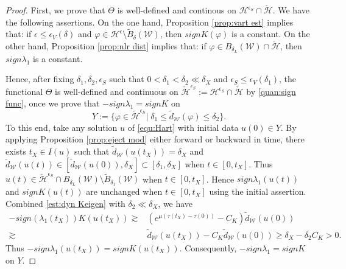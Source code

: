 \documentclass[reqno, 11pt]{amsart}
\numberwithin{equation}{section}
\theoremstyle{plain}
\theoremstyle{definition}
\numberwithin{equation}{section}
\numberwithin{theorem}{section}
\numberwithin{equation}{section}
\numberwithin{equation}{section}
\numberwithin{theorem}{section}
\begin{document}
	\begin{proof}
		First, we prove that $\Theta$ is well-defined and continous on $\mathcal{H}^{\epsilon_S} \cap \check{\mathcal{H}}$. We have the following assertions. On the one hand, Proposition \ref{prop:vart est} implies that: if $\epsilon\leq \epsilon_{V}(\delta)$ and $\varphi\in \mathcal{H}^{\epsilon}\setminus \widetilde{B}_{\delta}(\mathcal{W})$, then $signK(\varphi)$ is a constant. On the other hand, Proposition \ref{prop:nlr dist} implies that: if $\varphi\in B_{\delta_L}(\mathcal{W})\cap \check{\mathcal{H}}$, then $sign \lambda_{1}$ is a constant.
		
		Hence, after fixing $\delta_1,\delta_2,\epsilon_{S}$ such that $0<\delta_1<\delta_2\ll \delta_{X}$ and $\epsilon_S\leq \epsilon_{V}(\delta_1)$, the functional $\Theta$ is well-defined  and continuous on $\check{\mathcal{H}}^{\epsilon_S}:=\mathcal{H}^{\epsilon_S}\cap \check{\mathcal{H}}$ by \eqref{quan:sign func}, once we prove that $-sign \lambda_{1}=signK$ on 
		\begin{equation*}
		Y:=\{ \varphi\in \check{\mathcal{H}}^{\epsilon_S}|\;\delta_1\leq \widetilde{d}_{\mathcal{W}}(\varphi)\leq \delta_2 \}.
		\end{equation*}
		To this end, take any solution $u$ of \eqref{equ:Hart} with initial data $u(0)\in Y$. By applying Proposition \ref{prop:eject mod} either forward or backward in time, there exists $t_X\in I(u)$ such that $\widetilde{d}_{\mathcal{W}}(u(t_X))=\delta_X$ and $\widetilde{d}_{\mathcal{W}}(u(t))\in [\widetilde{d}_{\mathcal{W}}(u(0)),\delta_{X}] \subset [\delta_1,\delta_X]$ when $t\in[0,t_X]$. Thus $u(t)\in \check{\mathcal{H}}^{\epsilon_S} \cap B_{\delta_{L}}(\mathcal{W}) \setminus \widetilde{B}_{\delta_1}(\mathcal{W})$ when $t\in[0,t_X]$. Hence $sign\lambda_{1}(u(t))$ and $signK(u(t))$ are unchanged when $t\in[0,t_X]$ using the initial assertion. Combined \eqref{est:dyn Keigen} with $\delta_2\ll \delta_{X}$, we have
		\begin{equation*}
		\begin{aligned}
		-sign(\lambda_{1}(t_X))K(u(t_X))\gtrsim& \left( e^{\mu(\tau(t_X)-\tau(0) )}-C_K \right)\widetilde{d}_{\mathcal{W}}(u(0))\\\gtrsim& \widetilde{d}_{\mathcal{W}}(u(t_X))-C_K\widetilde{d}_{\mathcal{W}}(u(0))\geq\delta_{X}-\delta_2C_K>0.
		\end{aligned}
		\end{equation*}
		Thus $-sign\lambda_{1}(u(t_X))=signK(u(t_X))$. Consequently, $-sign\lambda_{1}=signK$ on $Y$.
		

\end{proof}
\end{document}
